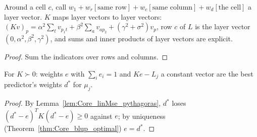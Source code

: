 \begin{lemma}\label{lem:crossed_layer}
  \leanok
  Around a cell $c$, call $w_1 + w_r[\text{same row}] + w_c[\text{same column}] + w_d[\text{the
  cell}]$ a layer vector. $K$ maps layer vectors to layer vectors:
  $(Kv)_p = \alpha^2\sum_t v_{p_1 t} + \beta^2\sum_a v_{a p_2} + (\gamma^2 + \sigma^2)v_p$, row $c$
  of $L$ is the layer vector $(0, \alpha^2, \beta^2, \gamma^2)$, and sums and inner products of
  layer vectors are explicit.
\end{lemma}
\begin{proof}
  \leanok
  Sum the indicators over rows and columns.
\end{proof}

\begin{lemma}\label{lem:eq_blupWeight_of_mulVec}
  \leanok
  For $K \succ 0$: weights $e$ with $\sum_i e_i = 1$ and $Ke - L_j$ a constant vector are
  the best predictor's weights $d^*$ for $\mu_j$.
\end{lemma}
\begin{proof}
  \leanok
  By Lemma~\ref{lem:Core_linMse_pythagoras}, $d^*$ loses $(d^* - e)^TK(d^* - e) \ge 0$
  against $e$; by uniqueness (Theorem~\ref{thm:Core_blup_optimal}) $e = d^*$.
\end{proof}

